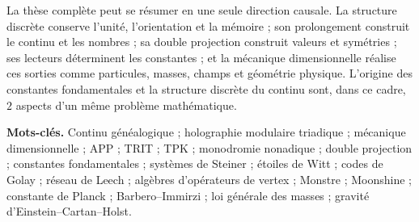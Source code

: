 La thèse complète peut se résumer en une seule direction causale. La structure
discrète conserve l'unité, l'orientation et la mémoire ; son prolongement
construit le continu et les nombres ; sa double projection construit valeurs et
symétries ; ses lecteurs déterminent les constantes ; et la mécanique dimensionnelle réalise
ces sorties comme particules, masses, champs et géométrie physique. L'origine des
constantes fondamentales et la structure discrète du continu sont, dans
ce cadre, \(2\) aspects d'un même problème mathématique.

\medskip
\noindent\textbf{Mots-clés.}
Continu généalogique ; holographie modulaire triadique ; mécanique dimensionnelle ;
APP ; TRIT ; TPK ; monodromie nonadique ; double projection ; constantes
fondamentales ; systèmes de Steiner ; étoiles de Witt ; codes de Golay ;
réseau de Leech ; algèbres d'opérateurs de vertex ; Monstre ; Moonshine ;
constante de Planck ; Barbero--Immirzi ; loi générale des masses ; gravité
d'Einstein--Cartan--Holst.

\ifdefined\HMTTeoremaGeneradorFrontalCargado
\else
  \clearpage
  
\fi
